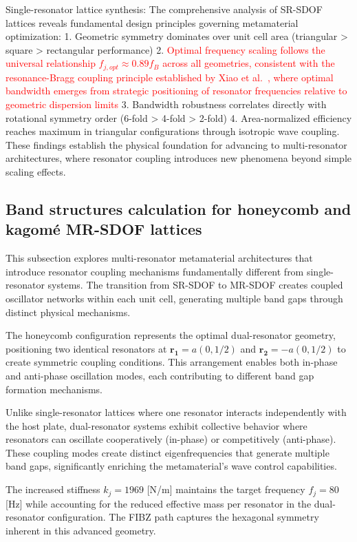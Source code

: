 \documentclass[review,numbers,sort&compress]{elsarticle}
\begin{document}
Single-resonator lattice synthesis: The comprehensive analysis of SR-SDOF lattices reveals fundamental design principles governing metamaterial optimization:
1. Geometric symmetry dominates over unit cell area (triangular > square > rectangular performance)
2. \textcolor{red}{Optimal frequency scaling follows the universal relationship $f_{j,opt} \approx 0.89 f_B$ across all geometries, consistent with the resonance-Bragg coupling principle established by Xiao et al.~\cite{Xiao_2012}, where optimal bandwidth emerges from strategic positioning of resonator frequencies relative to geometric dispersion limits}
3. Bandwidth robustness correlates directly with rotational symmetry order (6-fold > 4-fold > 2-fold)
4. Area-normalized efficiency reaches maximum in triangular configurations through isotropic wave coupling.
These findings establish the physical foundation for advancing to multi-resonator architectures, where resonator coupling introduces new phenomena beyond simple scaling effects.


\subsection{Band structures calculation for honeycomb and kagomé MR-SDOF lattices}
\label{kh_disp_pwe}
This subsection explores multi-resonator metamaterial architectures that introduce resonator coupling mechanisms fundamentally different from single-resonator systems. The transition from SR-SDOF to MR-SDOF creates coupled oscillator networks within each unit cell, generating multiple band gaps through distinct physical mechanisms.

The honeycomb configuration represents the optimal dual-resonator geometry, positioning two identical resonators at \( \mathbf{r_1} = a(0, 1/2) \) and \( \mathbf{r_2} = -a(0, 1/2) \) to create symmetric coupling conditions. This arrangement enables both in-phase and anti-phase oscillation modes, each contributing to different band gap formation mechanisms.

Unlike single-resonator lattices where one resonator interacts independently with the host plate, dual-resonator systems exhibit collective behavior where resonators can oscillate cooperatively (in-phase) or competitively (anti-phase). These coupling modes create distinct eigenfrequencies that generate multiple band gaps, significantly enriching the metamaterial's wave control capabilities.

The increased stiffness \( k_j = 1969 \) [N/m] maintains the target frequency \( f_j = 80 \) [Hz] while accounting for the reduced effective mass per resonator in the dual-resonator configuration. The FIBZ path captures the hexagonal symmetry inherent in this advanced geometry.
\end{document}
